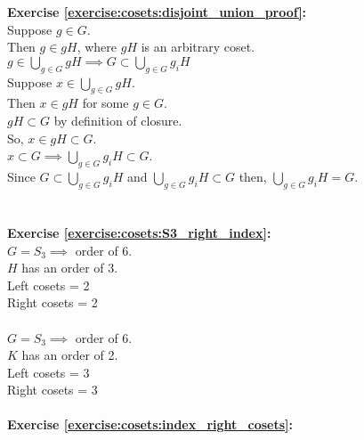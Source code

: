 \noindent\textbf{Exercise \ref{exercise:cosets:disjoint_union_proof}:} %
\\
Suppose $g \in G$.
\\
Then $g \in gH$, where $gH$ is an arbitrary coset.
\\
\bigskip
$g \in \bigcup\limits_{g \in G} gH \implies G \subset \bigcup\limits_{g \in G} g_iH$
\\
\bigskip
Suppose $x \in \bigcup\limits_{g \in G} gH$.
\\
Then $x \in gH$ for some $ g \in G$.
\\
$gH \subset G$ by definition of closure.
\\
So, $x \in gH \subset G$.
\\
\bigskip
$x \subset G \implies \bigcup\limits_{g \in G} g_iH \subset G$.
\\
Since $G \subset \bigcup\limits_{g \in G} g_iH$ and $\bigcup\limits_{g \in G} g_iH \subset G$ then, $\bigcup\limits_{g \in G} g_iH = G$.
\\
\\
\\
\textbf{Exercise \ref{exercise:cosets:S3_right_index}:}
\\
$G = S_3 \implies$ order of 6.
\\
$H$ has an order of 3.
\\
Left cosets = 2
\\
Right cosets = 2
\\
\\
$G = S_3 \implies$ order of 6.
\\
$K$ has an order of 2.
\\
Left cosets = 3
\\
Right cosets  = 3
\\
\\
\textbf{Exercise \ref{exercise:cosets:index_right_cosets}:}
